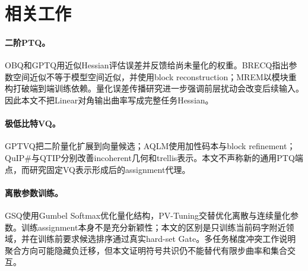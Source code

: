 \section{相关工作}

\paragraph{二阶PTQ。} OBQ和GPTQ用近似Hessian评估误差并反馈给尚未量化的权重\cite{obc,gptq}。BRECQ指出参数空间近似不等于模型空间近似，并使用block reconstruction\cite{brecq}；MREM以模块重构打破端到端训练依赖\cite{mrem}。量化误差传播研究进一步强调前层扰动会改变后续输入\cite{qep}。因此本文不把Linear对角输出曲率写成完整任务Hessian。

\paragraph{极低比特VQ。} GPTVQ把二阶量化扩展到向量候选\cite{gptvq}；AQLM使用加性码本与block refinement\cite{aqlm}；QuIP\#与QTIP分别改善incoherent几何和trellis表示\cite{quip,qtip}。本文不声称新的通用PTQ端点，而研究固定VQ表示形成后的assignment代理。

\paragraph{离散参数训练。} GSQ使用Gumbel Softmax优化量化结构\cite{gsq}，PV-Tuning交替优化离散与连续量化参数\cite{pvtuning}。训练assignment本身不是充分新颖性；本文的区别是只训练当前码字附近领域，并在训练前要求候选排序通过真实hard-set Gate。多任务梯度冲突工作说明聚合方向可能隐藏负迁移\cite{pcgrad}，但本文证明符号共识仍不能替代有限步曲率和集合交互。

